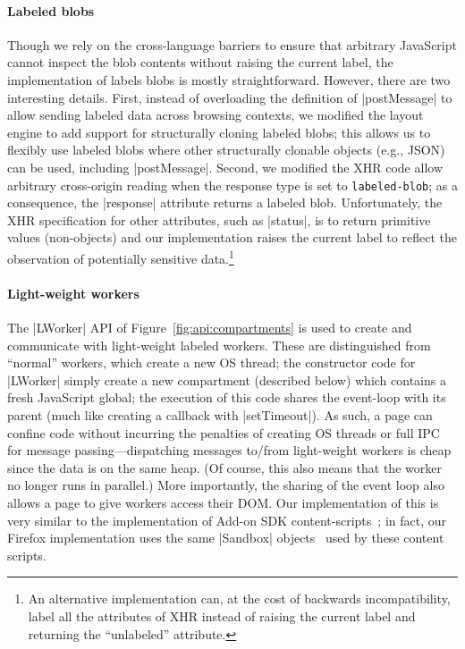 \paragraph{Labeled blobs}
%
Though we rely on the cross-language barriers to ensure that arbitrary
JavaScript cannot inspect the blob contents without raising the
current label, the implementation of labels blobs is mostly straightforward.
%
However, there are two interesting details.
%
First, instead of overloading the definition of \js|postMessage| to
allow sending labeled data across browsing contexts, we modified the
layout engine to add support for structurally cloning labeled blobs;
this allows us to flexibly use labeled blobs where other structurally
clonable objects (e.g., JSON) can be used, including \js|postMessage|.
%
Second, we modified the XHR code allow arbitrary cross-origin reading
when the response type is set to \verb|labeled-blob|;
%
as a consequence, the \js|response| attribute returns a labeled blob.
%
Unfortunately, the XHR specification for other attributes, such as
\js|status|, is to return primitive values (non-objects) and our
implementation raises the current label to reflect the observation of
potentially sensitive data.\footnote{
An alternative implementation can, at the cost of backwards
incompatibility, label all the attributes of XHR instead of raising
the current label and returning the ``unlabeled'' attribute.
}

\paragraph{Light-weight workers}
%
The \js|LWorker| API of Figure~\ref{fig:api:compartments} is used to
create and communicate with light-weight labeled workers.
%
These are distinguished from ``normal'' workers, which create a new OS thread; the
constructor code for \js|LWorker| simply create a new compartment
(described below) which contains a fresh JavaScript global; the
execution of this code shares the event-loop with its parent (much
like creating a callback with \js|setTimeout|).
%
As such, a page can confine code without incurring the
penalties of creating OS threads or full IPC for message
passing---dispatching messages to/from light-weight workers is cheap
since the data is on the same heap.
%
(Of course, this also means that the worker no longer runs in parallel.)
%
More importantly, the sharing of the event loop also allows a page to
give workers access their DOM\@.
%
Our implementation of this is very similar to the implementation of
Add-on SDK content-scripts~\cite{addon-sdk}; in fact, our Firefox
implementation uses the same \js|Sandbox| objects~\cite{mdn-sandbox}
used by these content scripts.
 


